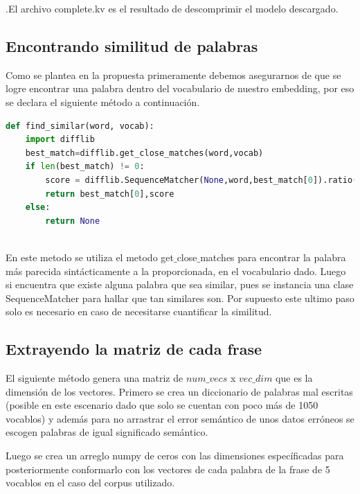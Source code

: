 .El archivo complete.kv es el resultado de descomprimir el modelo descargado.
\subsection{Encontrando similitud de palabras}
Como se plantea en la propuesta primeramente debemos asegurarnos de que se logre encontrar una palabra dentro del vocabulario de nuestro embedding, por eso se declara el siguiente método a continuación.

\begin{lstlisting}[language=Python, caption={Método para encontrar palabras similares en un vocabulario}]
  def find_similar(word, vocab):
  	import difflib
  	best_match=difflib.get_close_matches(word,vocab)
  	if len(best_match) != 0:
    	score = difflib.SequenceMatcher(None,word,best_match[0]).ratio()
    	return best_match[0],score
    else:
    	return None
    	
\end{lstlisting}
En este metodo se utiliza el metodo get$\_{}$close$\_{}$matches para encontrar la palabra más parecida sintácticamente a la proporcionada, en el vocabulario dado.
Luego si encuentra que existe alguna palabra que sea similar, pues se instancia una clase SequenceMatcher para hallar que tan similares son. Por supuesto este ultimo paso solo es necesario en caso de necesitarse cuantificar la similitud.

\subsection{Extrayendo la matriz de cada frase}
El siguiente método genera una matriz de $num\_{}vecs$ x $vec\_{}dim$ que es la dimensión de los vectores. 
Primero se crea un diccionario de palabras mal escritas (posible en este escenario dado que solo se cuentan con poco más de 1050 vocablos) y además para no arrastrar el error semántico de unos datos erróneos se escogen palabras de igual significado semántico.

Luego se crea un arreglo numpy de ceros con las dimensiones específicadas para posteriormente conformarlo con los vectores de cada palabra de la frase de 5 vocablos en el caso del corpus utilizado.

